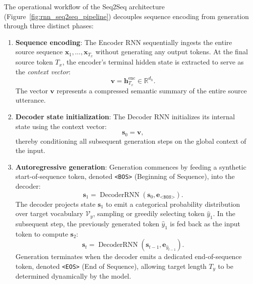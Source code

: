 \documentclass[../../../main.tex]{subfiles}
\begin{document}
The operational workflow of the Seq2Seq architecture (Figure~\ref{fig:rnn_seq2seq_pipeline}) decouples sequence encoding from generation through three distinct phases:
\begin{enumerate}
    \item \textbf{Sequence encoding}: The Encoder RNN sequentially ingests the entire source sequence $\mathbf{x}_1, \dots, \mathbf{x}_{T_x}$ without generating any output tokens. At the final source token $T_x$, the encoder's terminal hidden state is extracted to serve as the \textit{context vector}:
    \begin{equation}
    \mathbf{v} = \mathbf{h}_{T_x}^{\text{enc}} \in \mathbb{R}^{d_h}.
    \label{eq:context_vector}
    \end{equation}
    The vector $\mathbf{v}$ represents a compressed semantic summary of the entire source utterance.
    
    \item \textbf{Decoder state initialization}: The Decoder RNN initializes its internal state using the context vector:
    \begin{equation}
    \mathbf{s}_0 = \mathbf{v},
    \end{equation}
    thereby conditioning all subsequent generation steps on the global context of the input.
    
    \item \textbf{Autoregressive generation}: Generation commences by feeding a synthetic start-of-sequence token, denoted \texttt{<BOS>} (Beginning of Sequence), into the decoder:
    \begin{equation}
    \mathbf{s}_1 = \operatorname{DecoderRNN}\left(\mathbf{s}_0, \mathbf{e}_{\texttt{<BOS>}}\right).
    \end{equation}
    The decoder projects state $\mathbf{s}_1$ to emit a categorical probability distribution over target vocabulary $\mathcal{V}_y$, sampling or greedily selecting token $\hat{y}_1$. In the subsequent step, the previously generated token $\hat{y}_1$ is fed back as the input token to compute $\mathbf{s}_2$:
    \begin{equation}
    \mathbf{s}_t = \operatorname{DecoderRNN}\left(\mathbf{s}_{t-1}, \mathbf{e}_{\hat{y}_{t-1}}\right).
    \label{eq:decoder_autoregression}
    \end{equation}
    Generation terminates when the decoder emits a dedicated end-of-sequence token, denoted \texttt{<EOS>} (End of Sequence), allowing target length $T_y$ to be determined dynamically by the model.
\end{enumerate}
\end{document}
